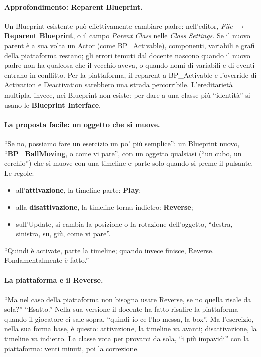 \paragraph{Approfondimento: Reparent Blueprint.} Un Blueprint esistente può effettivamente
cambiare padre: nell'editor, \emph{File} $\rightarrow$ \textbf{Reparent Blueprint}, o il
campo \emph{Parent Class} nelle \emph{Class Settings}. Se il nuovo parent è a sua volta un
Actor (come BP\_Activable), componenti, variabili e grafi della piattaforma restano; gli
errori temuti dal docente nascono quando il nuovo padre non ha qualcosa che il vecchio
aveva, o quando nomi di variabili e di eventi entrano in conflitto. Per la piattaforma,
il reparent a BP\_Activable e l'override di Activation e Deactivation sarebbero una
strada percorribile. L'ereditarietà multipla, invece, nei Blueprint non esiste: per
dare a una classe più ``identità'' si usano le \textbf{Blueprint Interface}.

\paragraph{La proposta facile: un oggetto che si muove.} ``Se no, possiamo fare un
esercizio un po' più semplice'': un Blueprint nuovo, ``\textbf{BP\_BallMoving}, o come vi
pare'', con un oggetto qualsiasi (``un cubo, un cerchio'') che si muove con una timeline e
parte solo quando si preme il pulsante. Le regole:
\begin{itemize}
  \item all'\textbf{attivazione}, la timeline parte: \textbf{Play};
  \item alla \textbf{disattivazione}, la timeline torna indietro: \textbf{Reverse};
  \item sull'Update, si cambia la posizione o la rotazione dell'oggetto, ``destra,
        sinistra, su, giù, come vi pare''.
\end{itemize}
``Quindi è activate, parte la timeline; quando invece finisce, Reverse. Fondamentalmente
è fatto.''

\paragraph{La piattaforma e il Reverse.} ``Ma nel caso della piattaforma non bisogna
usare Reverse, se no quella risale da sola?'' ``Esatto.'' Nella sua versione il docente
ha fatto risalire la piattaforma quando il giocatore ci sale sopra, ``quindi io ce l'ho
messa, la box''. Ma l'esercizio, nella sua forma base, è questo: attivazione, la timeline
va avanti; disattivazione, la timeline va indietro. La classe vota per provarci da sola,
``i più impavidi'' con la piattaforma: venti minuti, poi la correzione.

